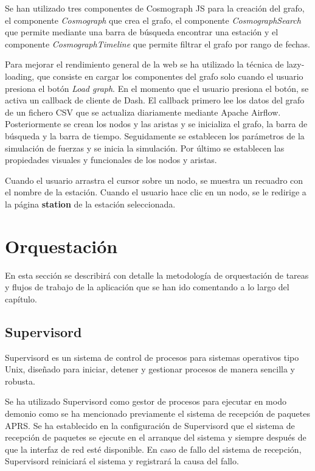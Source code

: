 Se han utilizado tres componentes de Cosmograph JS para la creación del grafo, el componente \textit{Cosmograph} que crea el grafo, el componente \textit{CosmographSearch} que permite mediante una barra de búsqueda encontrar una estación y el componente \textit{CosmographTimeline} que permite filtrar el grafo por rango de fechas.

Para mejorar el rendimiento general de la web se ha utilizado la técnica de lazy-loading, que consiste en cargar los componentes del grafo solo cuando el usuario presiona el botón \textit{Load graph}. En el momento que el usuario presiona el botón, se activa un callback de cliente de Dash. El callback primero lee los datos del grafo de un fichero CSV que se actualiza diariamente mediante Apache Airflow. Posteriormente se crean los nodos y las aristas y se inicializa el grafo, la barra de búsqueda y la barra de tiempo. Seguidamente se establecen los parámetros de la simulación de fuerzas y se inicia la simulación. Por último se establecen las propiedades visuales y funcionales de los nodos y aristas.

Cuando el usuario arrastra el cursor sobre un nodo, se muestra un recuadro con el nombre de la estación. Cuando el usuario hace clic en un nodo, se le redirige a la página \textbf{station} de la estación seleccionada.

\section{Orquestación}

En esta sección se describirá con detalle la metodología de orquestación de tareas y flujos de trabajo de la aplicación que se han ido comentando a lo largo del capítulo.

\subsection{Supervisord}
Supervisord es un sistema de control de procesos para sistemas operativos tipo Unix, diseñado para iniciar, detener y gestionar procesos de manera sencilla y robusta.

Se ha utilizado Supervisord como gestor de procesos para ejecutar en modo demonio como se ha mencionado previamente el sistema de recepción de paquetes APRS. Se ha establecido en la configuración de Supervisord que el sistema de recepción de paquetes se ejecute en el arranque del sistema y siempre después de que la interfaz de red esté disponible. En caso de fallo del sistema de recepción, Supervisord reiniciará el sistema y registrará la causa del fallo.

